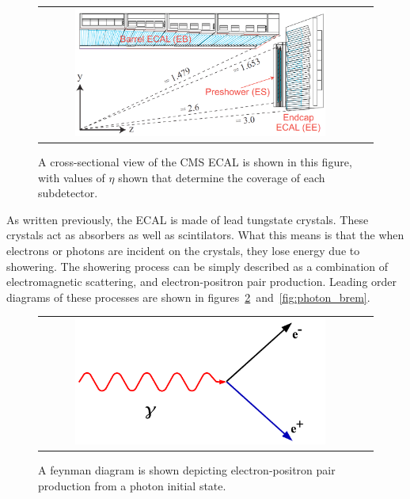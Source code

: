 \begin{figure}[!ht]
\begin{center}
\begin{tabular}{cc}
\includegraphics[width=0.8\textwidth]{cms/figs/Figures_Experimental_Apparatus_ECALRapidity.png}
\end{tabular}
\caption{ A cross-sectional view of the CMS ECAL is shown in this figure, with values of $\eta$ shown that determine the coverage of each subdetector.
\label{fig:ecal_eta}
}
\end{center}
\end{figure}

\clearpage

As written previously, the ECAL is made of lead tungstate crystals.
These crystals act as absorbers as well as scintilators.
What this means is that the when electrons or photons are incident on the crystals, they lose energy due to showering.
The showering process can be simply described as a combination of electromagnetic scattering, and electron-positron pair production.
Leading order diagrams of these processes are shown in figures~\ref{fig:pair_production}~and~\ref{fig:photon_brem}.

\begin{figure}[!ht]
\begin{center}
\begin{tabular}{cc}
\includegraphics[width=0.8\textwidth]{cms/figs/Pair_Production.png}
\end{tabular}
\caption{ A feynman diagram is shown depicting electron-positron pair production from a photon initial state.
\label{fig:pair_production}
}
\end{center}
\end{figure}


